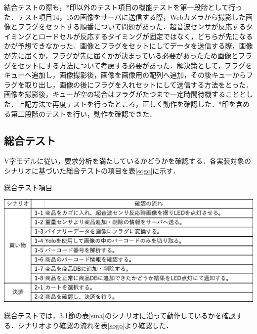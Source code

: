 結合テストの際も，*印以外のテスト項目の機能テストを第一段階として行った．テスト項目14，15の画像をサーバに送信する際，Webカメラから撮影した画像とフラグをセットする順番について問題があった．超音波センサが反応するタイミングとロードセルが反応するタイミングが固定ではなく，どちらが先になるかが予想できなかった．画像とフラグをセットにしてデータを送信する際，画像が先に届くか，フラグが先に届くかが決まっている必要があったため画像とフラグをセットにする方法について考慮する必要があった．解決策として，フラグをキューへ追加し，画像撮影後，画像を画像用の配列へ追加，その後キューからフラグを取り出し，画像の後にフラグを入れセットにして送信する方法をとった．画像を撮影後，キューが空の場合はフラグがたつまで一定時間待機することとした．上記方法で再度テストを行ったところ，正しく動作を確認した．*印を含める第二段階のテストを行い，動作を確認できた．


\subsection{総合テスト}

V字モデルに従い，要求分析を満たしているかどうかを確認する．各実装対象のシナリオに基づいた総合テストの項目を表\ref{sogo}に示す．


\begin{table}[htbp]
\centering
\caption{総合テスト項目}
\includegraphics[width = 15cm]{./picture/sogo.eps}
\label{sogo}
\end{table}

総合テストでは，3.1節の表\ref{sina}のシナリオに沿って動作しているかを確認する．シナリオより確認の流れを表\ref{sogo}より確認した．
